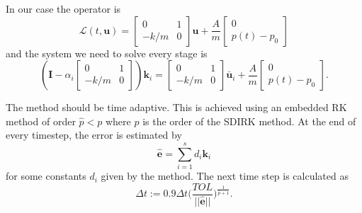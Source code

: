 \documentclass[]{article}
\begin{document}
In our case the operator is
\begin{equation}
    \mathcal{L}(t, \mathbf{u}) = \begin{bmatrix} 0 & 1 \\ -k/m & 0\end{bmatrix}\mathbf{u} + \frac{A}{m} \begin{bmatrix} 0 \\ p(t)-p_0\end{bmatrix}
\end{equation}
and the system we need to solve every stage is
\begin{equation}
(\mathbf{I} - \alpha_i \begin{bmatrix} 0 & 1 \\ -k/m & 0\end{bmatrix})\mathbf{k}_i  = \begin{bmatrix} 0 & 1 \\ -k/m & 0\end{bmatrix}\bar{\mathbf{u}}_i + \frac{A}{m} \begin{bmatrix} 0 \\ p(t)-p_0\end{bmatrix}.
\end{equation}

The method should be time adaptive. This is achieved using an embedded RK method of order $\hat{p} < p$ where $p$ is the order of the SDIRK method. At the end of every timestep, the error is estimated by
\begin{equation}
    \hat{\mathbf{e}} = \sum_{i=1}^s d_i \mathbf{k}_i
\end{equation}
for some constants $d_i$ given by the method. The next time step is calculated as
\begin{equation}
    \Delta t := 0.9 \Delta t \bigg(\frac{TOL}{||\hat{\mathbf{e}}||}\bigg)^{\frac{1}{\hat{p}+1}}.
\end{equation} 
\end{document}
